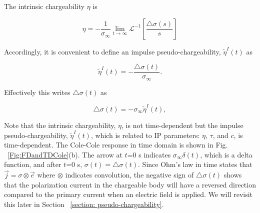 \documentclass[extra,mreferee]{gji}
\newcommand{\siginf}{\sigma_\infty}
\newcommand{\dsig}{\triangle\sigma}
\renewcommand {\j}  { {\vec j} }
\newcommand {\e}  { {\vec e} }
\newcommand{\peta}{\tilde{\eta}}
\begin{document}
The intrinsic chargeability $\eta$ is
\begin{linenomath*}
\begin{equation}
  \eta= -\frac{1}{\siginf} \lim_{t \to \infty}\mathscr{L}^{-1}[\frac{\dsig(s)}{s}]
\end{equation}
\end{linenomath*}
Accordingly, it is convenient to define an impulse pseudo-chargeability, $\peta^{I}(t)$ as
\begin{linenomath*}
\begin{equation}
    \peta^{I}(t) = -\frac{\dsig(t)}{\siginf}. %
    \label{eq: intrinsic_peta}
\end{equation}
\end{linenomath*}
Effectively this writes $\dsig(t)$ as
\begin{linenomath*}
\begin{equation}
  \dsig(t) = - \siginf\peta^{I}(t),
  \label{eq: sigma_time_c1}
\end{equation}
\end{linenomath*}
Note that the intrinsic chargeability, $\eta$, is not time-dependent but the impulse pseudo-chargeability, $\peta^{I}(t)$, which is related to IP parameters: $\eta$, $\tau$, and $c$, is time-dependent.
The Cole-Cole response in time domain is shown in Fig. ~\ref{Fig:FDandTDCole}(b). The arrow at $t$=0 s indicates $\siginf \delta(t)$, which is a delta function, and after $t$=0 s, $\sigma (t) = \dsig(t)$. Since Ohm's law in time states that $\j=\sigma \otimes \e$ where $\otimes$ indicates convolution, the negative sign of $\dsig(t)$ shows that the polarization current in the chargeable body will have a reversed direction compared to the primary current when an electric field is applied. We will revisit this later in Section ~\ref{section: pseudo-chargeability}.

\end{document}
